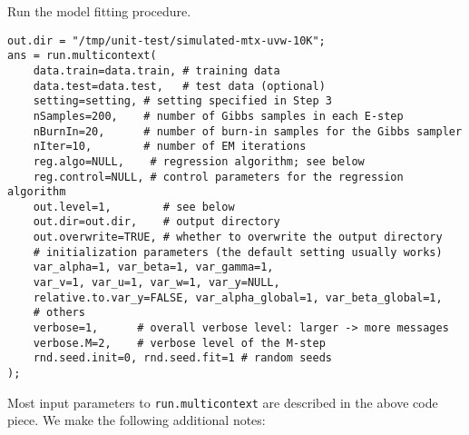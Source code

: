 \documentclass[10pt]{article}
\newcommand{\parahead}[1]{\vspace{0.15in}\noindent{\bf #1:}}
\begin{document}
\parahead{Step 4}
Run the model fitting procedure.
{\small\begin{verbatim}
out.dir = "/tmp/unit-test/simulated-mtx-uvw-10K";
ans = run.multicontext(
    data.train=data.train, # training data
    data.test=data.test,   # test data (optional)
    setting=setting, # setting specified in Step 3
    nSamples=200,    # number of Gibbs samples in each E-step
    nBurnIn=20,      # number of burn-in samples for the Gibbs sampler
    nIter=10,        # number of EM iterations
    reg.algo=NULL,    # regression algorithm; see below
    reg.control=NULL, # control parameters for the regression algorithm
    out.level=1,        # see below
    out.dir=out.dir,    # output directory
    out.overwrite=TRUE, # whether to overwrite the output directory
    # initialization parameters (the default setting usually works)
    var_alpha=1, var_beta=1, var_gamma=1, 
    var_v=1, var_u=1, var_w=1, var_y=NULL,
    relative.to.var_y=FALSE, var_alpha_global=1, var_beta_global=1,
    # others
    verbose=1,      # overall verbose level: larger -> more messages
    verbose.M=2,    # verbose level of the M-step
    rnd.seed.init=0, rnd.seed.fit=1 # random seeds
);
\end{verbatim}}
\noindent Most input parameters to {\tt run.multicontext} are described in the above code piece. We make the following additional notes:
\end{document}
